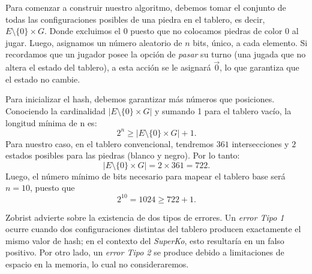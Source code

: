 Para comenzar a construir nuestro algoritmo, debemos tomar el conjunto de todas las configuraciones posibles de una piedra en el tablero, es decir, $E \setminus \{0\} \times G.$
Donde excluimos el $0$ puesto que no colocamos piedras de color $0$ al jugar. Luego, asignamos un número aleatorio de $n$ bits, único, a cada elemento. Si recordamos que un jugador posee la opción de \textit{pasar} su turno (una jugada que no altera el estado del tablero), a esta acción se le asignará $\vec{0}$, lo que garantiza que el estado no cambie.

Para inicializar el hash, debemos garantizar más números que posiciones. Conociendo la cardinalidad $|E\setminus\{0\}\times G|$ y sumando 1 para el tablero vacío, la longitud mínima de n es:
\[ 2^n \geq |E \setminus \{0\} \times G| + 1. \]
Para nuestro caso, en el tablero convencional, tendremos $361$ intersecciones y $2$ estados posibles para las piedras (blanco y negro). Por lo tanto:
$$|E\setminus\{0\} \times G| = 2 \times 361 = 722.$$
Luego, el número mínimo de bits necesario para mapear el tablero base será $n = 10$, puesto que
$$2^{10} = 1024 \geq 722 + 1.$$

Zobrist advierte sobre la existencia de dos tipos de errores. Un \textit{error Tipo 1} ocurre cuando dos configuraciones distintas del tablero producen exactamente el mismo valor de hash; en el contexto del \textit{SuperKo}, esto resultaría en un falso positivo. Por otro lado, un \textit{error Tipo 2} se produce debido a limitaciones de espacio en la memoria, lo cual no consideraremos.

